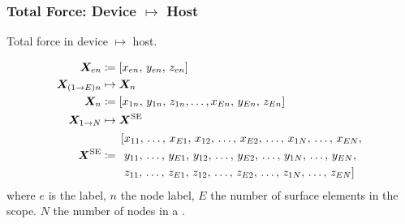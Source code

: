 \subsubsection{Total Force: Device $ \mapsto $ Host}
\begin{algorithm}
	\caption{Total force in device $ \mapsto $ host.}
	\begin{algorithmic}[1]
		 
		 
		 
		\EndFor
		\EndFor
		\EndFunction
	\end{algorithmic}
\end{algorithm}
\begin{subequations}\label{eq:fcne}
	\begin{align}
		\vec{X}_{en}          & \coloneqq	\left[x_{en},\, y_{en},\, z_{en}\right]                                                     \\
		\vec{X}_{(1\to E)n}   & \mapsto 	\vec{X}_{n} \nn
		\vec{X}_{n}           & \coloneqq	\left[x_{1n},\, y_{1n},\, z_{1n},\ldots,x_{En},\, y_{En},\, z_{En}\right]\label{seq:xn_arr} \\
		\vec{X}_{1\to N}      & \mapsto	\vec{X}^{\textrm{SE}}\nn
		\vec{X}^{\textrm{SE}} & \coloneqq
		\begin{aligned}
			 & \left[x_{11},\, \ldots,\, x_{E1},\, x_{12},\, \ldots,\, x_{E2},\, \ldots,\, x_{1N},\, \ldots,\, x_{EN}, \right.   \\
			 & \left.\,y_{11},\, \ldots,\, y_{E1},\, y_{12},\, \ldots,\, y_{E2},\, \ldots,\, y_{1N},\, \ldots,\, y_{EN}, \right. \\
			 & \left.\,z_{11},\, \ldots,\, z_{E1},\, z_{12},\, \ldots,\, z_{E2},\, \ldots,\, z_{1N},\, \ldots,\, z_{EN}  \right]
		\end{aligned}
	\end{align}
\end{subequations}
where $ e $ is the  label, $ n $ the node label, $ E $ the number of surface elements in the scope. $ N $ the number of nodes in a .

